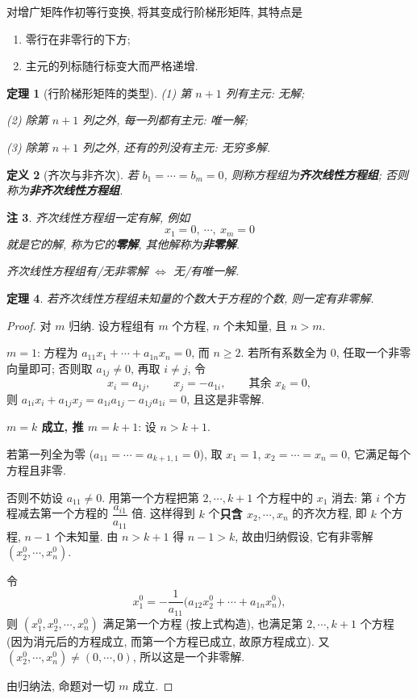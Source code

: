 \documentclass[UTF8,11pt]{ctexart}
\theoremstyle{cnthm}
\newtheorem{thm}{定理}[section]
\newtheorem{defn}[thm]{定义}
\newtheorem{rem}[thm]{注}
\begin{document}
对增广矩阵作初等行变换, 将其变成行阶梯形矩阵, 其特点是
\begin{enumerate}
\item 零行在非零行的下方;
\item 主元的列标随行标变大而严格递增.
\end{enumerate}

\begin{thm}[行阶梯形矩阵的类型]
(1) 第 $n+1$ 列有主元: 无解;

(2) 除第 $n+1$ 列之外, 每一列都有主元: 唯一解;

(3) 除第 $n+1$ 列之外, 还有的列没有主元: 无穷多解.
\end{thm}

\begin{defn}[齐次与非齐次]
若 $b_1=\cdots=b_m=0$, 则称方程组为\textbf{齐次线性方程组}; 否则称为\textbf{非齐次线性方程组}.
\end{defn}

\begin{rem}
齐次线性方程组一定有解, 例如
\[
x_1=0,\ \cdots,\ x_m=0
\]
就是它的解, 称为它的\textbf{零解}, 其他解称为\textbf{非零解}.

齐次线性方程组有/无非零解 $\iff$ 无/有唯一解.
\end{rem}

\begin{thm}
若齐次线性方程组未知量的个数大于方程的个数, 则一定有非零解.
\end{thm}

\begin{proof}
对 $m$ 归纳. 设方程组有 $m$ 个方程, $n$ 个未知量, 且 $n>m$.

\textbf{$m=1$}: 方程为 $a_{11}x_1+\cdots+a_{1n}x_n=0$, 而 $n\geq2$. 若所有系数全为 $0$, 任取一个非零向量即可; 否则取 $a_{1j}\neq0$, 再取 $i\neq j$, 令
\[
x_i=a_{1j},\qquad x_j=-a_{1i},\qquad \text{其余 }x_k=0,
\]
则 $a_{1i}x_i+a_{1j}x_j=a_{1i}a_{1j}-a_{1j}a_{1i}=0$, 且这是非零解.

\textbf{$m=k$ 成立, 推 $m=k+1$}: 设 $n>k+1$.

若第一列全为零 ($a_{11}=\cdots=a_{k+1,1}=0$), 取 $x_1=1$, $x_2=\cdots=x_n=0$, 它满足每个方程且非零.

否则不妨设 $a_{11}\neq0$. 用第一个方程把第 $2,\cdots,k+1$ 个方程中的 $x_1$ 消去: 第 $i$ 个方程减去第一个方程的 $\dfrac{a_{i1}}{a_{11}}$ 倍. 这样得到 $k$ 个\textbf{只含 $x_2,\cdots,x_n$} 的齐次方程, 即 $k$ 个方程, $n-1$ 个未知量. 由 $n>k+1$ 得 $n-1>k$, 故由归纳假设, 它有非零解 $(x_2^0,\cdots,x_n^0)$.

令
\[
x_1^0=-\frac{1}{a_{11}}\bigl(a_{12}x_2^0+\cdots+a_{1n}x_n^0\bigr),
\]
则 $(x_1^0,x_2^0,\cdots,x_n^0)$ 满足第一个方程 (按上式构造), 也满足第 $2,\cdots,k+1$ 个方程 (因为消元后的方程成立, 而第一个方程已成立, 故原方程成立). 又 $(x_2^0,\cdots,x_n^0)\neq(0,\cdots,0)$, 所以这是一个非零解.

由归纳法, 命题对一切 $m$ 成立.
\end{proof}
\end{document}
